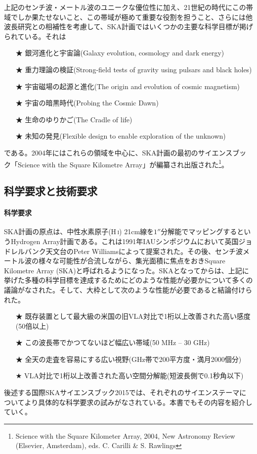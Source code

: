 上記のセンチ波・メートル波のユニークな優位性に加え、21世紀の時代にこの帯域でしか果たせないこと、この帯域が極めて重要な役割を担うこと、さらには他波長研究との相補性を考慮して、SKA計画ではいくつかの主要な科学目標が掲げられている。それは
\begin{itemize}
\item[★] 銀河進化と宇宙論(Galaxy evolution, cosmology and dark energy)
\item[★] 重力理論の検証(Strong-field tests of gravity using pulsars and black holes)
\item[★] 宇宙磁場の起源と進化(The origin and evolution of cosmic magnetism)
\item[★] 宇宙の暗黒時代(Probing the Cosmic Dawn)
\item[★] 生命のゆりかご(The Cradle of life)
\item[★] 未知の発見(Flexible design to enable exploration of the unknown)
\end{itemize}
である。2004年にはこれらの領域を中心に、SKA計画の最初のサイエンスブック「Science with the Square Kilometre Array」が編纂され出版された\footnote{
Science with the Square Kilometer Array, 2004, New Astronomy Review (Elsevier, Amsterdam), eds. C. Carilli \& S. Rawlings}。

\subsection{科学要求と技術要求}
\label{c01.s1.ss3}

\paragraph{科学要求} 

SKA計画の原点は、中性水素原子(H\,\textsc{i}) 21cm線を$1''$分解能でマッピングするというHydrogen Array計画である。これは1991年IAUシンポジウムにおいて英国ジョドレルバンク天文台のPeter Williamsによって提案された。その後、センチ波メートル波の様々な可能性が合流しながら、集光面積に焦点をおきSquare Kilometre Array (SKA)と呼ばれるようになった。SKAとなってからは、上記に挙げた多種の科学目標を達成するためにどのような性能が必要かについて多くの議論がなされた。そして、大枠として次のような性能が必要であると結論付けられた。
\begin{itemize}
\item[★] 既存装置として最大級の米国の旧VLA対比で1桁以上改善された高い感度(50倍以上)
\item[★] この波長帯でかつてないほど幅広い帯域(50 MHz -- 30 GHz)
\item[★] 全天の走査を容易にする広い視野(GHz帯で200平方度・満月2000個分)
\item[★] VLA対比で1桁以上改善された高い空間分解能(短波長側で0.1秒角以下)
\end{itemize}
後述する国際SKAサイエンスブック2015では、それぞれのサイエンステーマについてより具体的な科学要求の試みがなされている。本書でもその内容を紹介していく。

